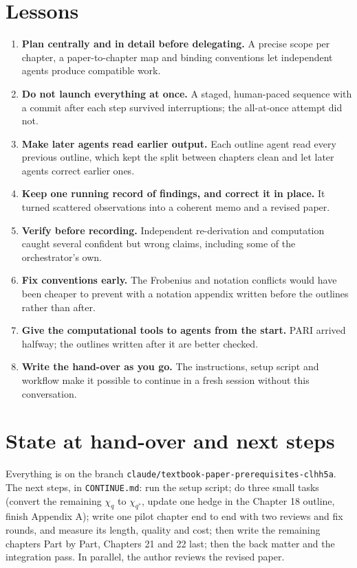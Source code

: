 \documentclass[11pt]{article}
\begin{document}
\section{Lessons}
\begin{enumerate}
\item \textbf{Plan centrally and in detail before delegating.} A precise scope per chapter, a paper-to-chapter map
and binding conventions let independent agents produce compatible work.
\item \textbf{Do not launch everything at once.} A staged, human-paced sequence with a commit after each step
survived interruptions; the all-at-once attempt did not.
\item \textbf{Make later agents read earlier output.} Each outline agent read every previous outline, which kept
the split between chapters clean and let later agents correct earlier ones.
\item \textbf{Keep one running record of findings, and correct it in place.} It turned scattered observations into
a coherent memo and a revised paper.
\item \textbf{Verify before recording.} Independent re-derivation and computation caught several confident but wrong
claims, including some of the orchestrator's own.
\item \textbf{Fix conventions early.} The Frobenius and notation conflicts would have been cheaper to prevent with a
notation appendix written before the outlines rather than after.
\item \textbf{Give the computational tools to agents from the start.} PARI arrived halfway; the outlines written
after it are better checked.
\item \textbf{Write the hand-over as you go.} The instructions, setup script and workflow make it possible to
continue in a fresh session without this conversation.
\end{enumerate}

\section{State at hand-over and next steps}
Everything is on the branch \texttt{claude/textbook-paper-prerequisites-clhh5a}. The next steps, in
\texttt{CONTINUE.md}: run the setup script; do three small tasks (convert the remaining $\chi_q$ to $\chi_{q^*}$,
update one hedge in the Chapter 18 outline, finish Appendix A); write one pilot chapter end to end with two reviews
and fix rounds, and measure its length, quality and cost; then write the remaining chapters Part by Part, Chapters
21 and 22 last; then the back matter and the integration pass. In parallel, the author reviews the revised paper.
\end{document}
